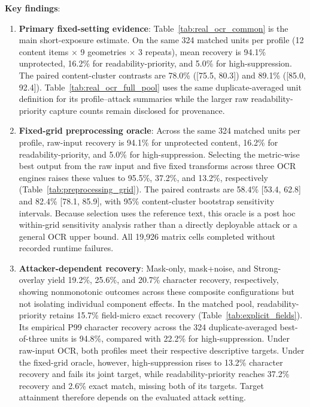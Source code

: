 \documentclass{ieeeaccess}
\begin{document}
\textbf{Key findings}:

\begin{enumerate}
\item \textbf{Primary fixed-setting evidence}: Table~\ref{tab:real_ocr_common} is the main short-exposure estimate. On the same 324 matched units per profile (12 content items $\times$ 9 geometries $\times$ 3 repeats), mean recovery is 94.1\% unprotected, 16.2\% for readability-priority, and 5.0\% for high-suppression. The paired content-cluster contrasts are 78.0\% ([75.5, 80.3]) and 89.1\% ([85.0, 92.4]). Table~\ref{tab:real_ocr_full_pool} uses the same duplicate-averaged unit definition for its profile--attack summaries while the larger raw readability-priority capture counts remain disclosed for provenance.

\item \textbf{Fixed-grid preprocessing oracle}: Across the same 324 matched units per profile, raw-input recovery is 94.1\% for unprotected content, 16.2\% for readability-priority, and 5.0\% for high-suppression. Selecting the metric-wise best output from the raw input and five fixed transforms across three OCR engines raises these values to 95.5\%, 37.2\%, and 13.2\%, respectively (Table~\ref{tab:preprocessing_grid}). The paired contrasts are 58.4\% [53.4, 62.8] and 82.4\% [78.1, 85.9], with 95\% content-cluster bootstrap sensitivity intervals. Because selection uses the reference text, this oracle is a post hoc within-grid sensitivity analysis rather than a directly deployable attack or a general OCR upper bound. All 19,926 matrix cells completed without recorded runtime failures.

\item \textbf{Attacker-dependent recovery}: Mask-only, mask+noise, and Strong-overlay yield 19.2\%, 25.6\%, and 20.7\% character recovery, respectively, showing nonmonotonic outcomes across these composite configurations but not isolating individual component effects. In the matched pool, readability-priority retains 15.7\% field-micro exact recovery (Table~\ref{tab:explicit_fields}). Its empirical P99 character recovery across the 324 duplicate-averaged best-of-three units is 94.8\%, compared with 22.2\% for high-suppression. Under raw-input OCR, both profiles meet their respective descriptive targets. Under the fixed-grid oracle, however, high-suppression rises to 13.2\% character recovery and fails its joint target, while readability-priority reaches 37.2\% recovery and 2.6\% exact match, missing both of its targets. Target attainment therefore depends on the evaluated attack setting.


\end{enumerate}
\end{document}

